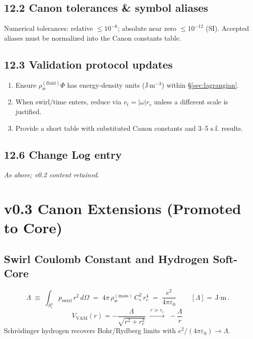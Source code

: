 \documentclass[11pt,a4paper]{article}
\newcommand{\aeFluid}{\rho_{\text{\ae}}^{(\text{fluid})}}
\newcommand{\aeMass}{\rho_{\text{\ae}}^{(\text{mass})}}
\newcommand{\Ce}{C_e}
\newcommand{\rc}{r_c}
\begin{document}
    \subsection*{12.2 Canon tolerances \& symbol aliases}
    Numerical tolerances: relative $\le 10^{-6}$; absolute near zero $\le 10^{-12}$ (SI). Accepted aliases must be normalized into the Canon constants table.
    \subsection*{12.3 Validation protocol updates}
    \begin{enumerate}
        \item Ensure $\aeFluid \Phi$ has energy-density units (J\,m$^{-3}$) within \S\ref{sec:lagrangian}.
        \item When swirl/time enters, reduce via $v_t=|\omega|\rc$ unless a different scale is justified.
        \item Provide a short table with substituted Canon constants and 3--5 s.f. results.
    \end{enumerate}
    \subsection*{12.6 Change Log entry}
    \textit{As above; v0.2 content retained.}

    \section{v0.3 Canon Extensions (Promoted to Core)}
    \label{sec:v03-extensions}

    \subsection{Swirl Coulomb Constant and Hydrogen Soft-Core}
    \label{sec:Lambda}
    \[
        \boxed{\, \Lambda \;\equiv\; \int_{S_r^2} p_{\text{swirl}}\,r^2\,d\Omega
        \;=\; 4\pi\,\aeMass\,\Ce^{2}\,\rc^{4}
            \;=\; \frac{e^{2}}{4\pi\varepsilon_0} \,}
        \qquad [\Lambda]=\text{J$\cdot$m}.
    \]
    \[
        \boxed{\, V_{\text{VAM}}(r) = -\frac{\Lambda}{\sqrt{r^2+\rc^2}}
        \;\xrightarrow{\,r\gg \rc\,}\;
        -\frac{\Lambda}{r} \,}
    \]
    Schrödinger hydrogen recovers Bohr/Rydberg limits with $e^2/(4\pi\varepsilon_0)\to\Lambda$. \cite{Jackson1999,Schrodinger1926}
\end{document}
